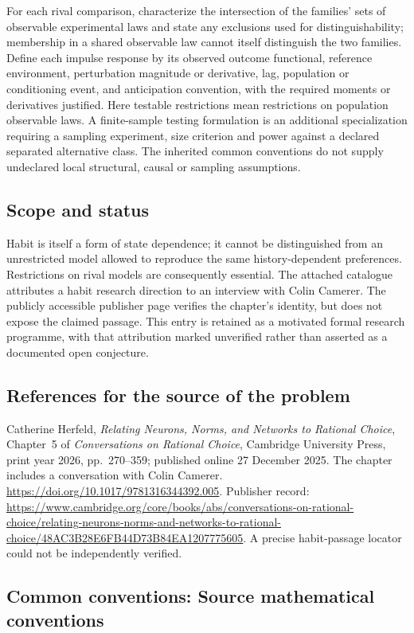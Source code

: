 \documentclass[11pt,a4paper]{article}
\begin{document}
For each rival comparison, characterize the intersection of the families' sets of observable experimental laws and state any exclusions used for distinguishability; membership in a shared observable law cannot itself distinguish the two families. Define each impulse response by its observed outcome functional, reference environment, perturbation magnitude or derivative, lag, population or conditioning event, and anticipation convention, with the required moments or derivatives justified. Here testable restrictions mean restrictions on population observable laws. A finite-sample testing formulation is an additional specialization requiring a sampling experiment, size criterion and power against a declared separated alternative class. The inherited common conventions do not supply undeclared local structural, causal or sampling assumptions.
\subsection*{Scope and status}
Habit is itself a form of state dependence; it cannot be distinguished from an unrestricted model allowed to reproduce the same history-dependent preferences. Restrictions on rival models are consequently essential. The attached catalogue attributes a habit research direction to an interview with Colin Camerer. The publicly accessible publisher page verifies the chapter's identity, but does not expose the claimed passage. This entry is retained as a motivated formal research programme, with that attribution marked unverified rather than asserted as a documented open conjecture.
\subsection*{References for the source of the problem}
Catherine Herfeld, \emph{Relating Neurons, Norms, and Networks to Rational Choice}, Chapter~5 of \emph{Conversations on Rational Choice}, Cambridge University Press, print year 2026, pp.~270--359; published online 27 December 2025. The chapter includes a conversation with Colin Camerer. \url{https://doi.org/10.1017/9781316344392.005}. Publisher record: \url{https://www.cambridge.org/core/books/abs/conversations-on-rational-choice/relating-neurons-norms-and-networks-to-rational-choice/48AC3B28E6FB44D73B84EA1207775605}. A precise habit-passage locator could not be independently verified.

\subsection*{Common conventions: Source mathematical conventions}
\end{document}
